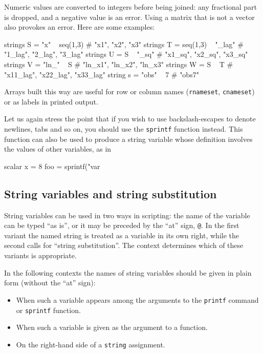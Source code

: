 Numeric values are converted to integers before being joined: any
fractional part is dropped, and a negative value is an error. Using a
matrix that is not a vector also provokes an error. Here are some
examples:
\begin{code}
strings S = "x" ~ seq(1,3)     # "x1", "x2", "x3"
strings T = seq(1,3) ~ "_lag"  # "1_lag", "2_lag", "3_lag"
strings U = S ~ "_sq"          # "x1_sq", "x2_sq", "x3_sq"
strings V = "ln_" ~ S          # "ln_x1", "ln_x2", "ln_x3"
strings W = S ~ T              # "x11_lag", "x22_lag", "x33_lag"
string  s = "obs" ~ 7          # "obs7"
\end{code}
Arrays built this way are useful for row or column names
(\texttt{rnameset}, \texttt{cnameset}) or as labels in printed output.

Let us again stress the point that if you wish to use backslash-escapes
to denote newlines, tabs and so on, you should use the \texttt{sprintf}
function instead. This function can also be used to produce a string
variable whose definition involves the values of other variables, as in
%
\begin{code}
scalar x = 8
foo = sprintf("var%
\end{code}

\subsection{String variables and string substitution}

String variables can be used in two ways in scripting: the name of the
variable can be typed ``as is'', or it may be preceded by the ``at''
sign, \verb|@|. In the first variant the named string is treated as a
variable in its own right, while the second calls for ``string
substitution''. The context determines which of these variants is
appropriate. 

In the following contexts the names of string variables should be
given in plain form (without the ``at'' sign):

\begin{itemize}
\item When such a variable appears among the arguments to the
  \texttt{printf} command or \texttt{sprintf} function.
\item When such a variable is given as the argument to a function.
\item On the right-hand side of a \texttt{string} assignment.
\end{itemize}

